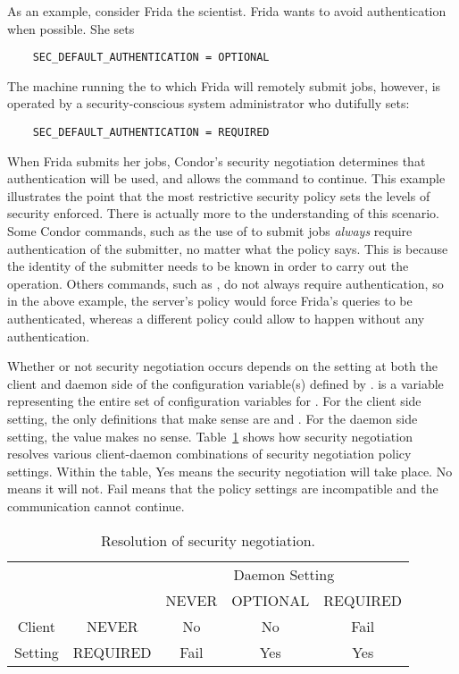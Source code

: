 As an example, consider Frida the scientist.
Frida wants to avoid authentication when possible.
She sets
\begin{verbatim}
    SEC_DEFAULT_AUTHENTICATION = OPTIONAL
\end{verbatim}
The machine running the 
to which Frida will remotely submit jobs,
however,
is operated by a security-conscious system administrator who dutifully
sets:
\begin{verbatim}
    SEC_DEFAULT_AUTHENTICATION = REQUIRED
\end{verbatim}
When Frida submits her jobs, Condor's security negotiation determines
that authentication will be used, and allows the command to continue.
This example illustrates the point that the most restrictive
security policy sets the levels of security enforced.
There is actually more to the understanding of this scenario.
Some Condor commands, such as the use of 
to submit jobs \emph{always} require
authentication of the submitter, no matter what the policy says. 
This is because the identity
of the submitter needs to be known in order to carry out the operation.
Others commands, such as , do not always require
authentication, so in the above example, the server's policy would
force Frida's  queries to be authenticated, whereas a different
policy could allow  to happen without any authentication.


Whether or not security negotiation occurs depends on the
setting at both the client and daemon side of the 
configuration variable(s) defined by .
 is a variable representing
the entire set of configuration variables for .
For the client side setting,
the only definitions that make sense are  and .
For the daemon side setting,
the  value makes no sense.
Table~\ref{table:Sec-Negotiation} shows how security negotiation
resolves various client-daemon combinations of security negotiation policy
settings.
Within the table, Yes means the security negotiation will take place.
No means it will not.
Fail means that the policy settings are incompatible and the communication
cannot continue.

\begin{table}[tb]
\centering
\begin{tabular}{|c|c|c|c|c|}
  \hline
  \multicolumn{2}{|c|}{\hfill} & \multicolumn{3}{c|}{Daemon Setting} \\
  \cline{3-5}
  \multicolumn{2}{|c|}{\hfill} & NEVER & OPTIONAL & REQUIRED \\
  \hline
  \cline{2-5}
  Client & NEVER & No & No & Fail \\
  \cline{2-5}
  Setting & REQUIRED & Fail & Yes & Yes \\
  \hline
\end{tabular}
\caption{\label{table:Sec-Negotiation}Resolution of security negotiation.  }
\end{table}


